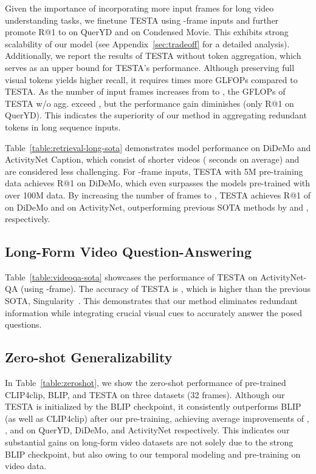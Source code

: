 \documentclass[11pt]{article}
\newcommand{\modelname}{TESTA\xspace}
\begin{document}
Given the importance of incorporating more input frames for long video understanding tasks, we finetune \modelname using -frame inputs and further promote R@1 to  on QuerYD and  on Condensed Movie. This exhibits strong scalability of our model (see Appendix~\ref{sec:tradeoff} for a detailed analysis). 
Additionally, we report the results of \modelname without token aggregation, which serves as an upper bound for \modelname's performance. 
Although preserving full visual tokens yields higher recall, it requires  times more GLFOPs compared to \modelname. 
As the number of input frames increases from  to , the GFLOPs of \modelname w/o agg. exceed , but the performance gain diminishes (only  R@1 on QuerYD). This indicates the superiority of our method in aggregating redundant tokens in long sequence inputs. 



Table~\ref{table:retrieval-long-sota} demonstrates model performance on  DiDeMo and ActivityNet Caption, which consist of shorter videos ( seconds on average) and are considered less challenging.  
For -frame inputs, \modelname with 5M pre-training data achieves  R@1 on DiDeMo, which even surpasses the models pre-trained with over 100M data. 
By increasing the number of frames to , \modelname achieves R@1 of  on DiDeMo and  on ActivityNet, outperforming previous SOTA methods by  and , respectively.~ 


\subsection{Long-Form Video Question-Answering}
Table~\ref{table:videoqa-sota} showcases the performance of \modelname on ActivityNet-QA (using -frame). 
The accuracy of \modelname is , which is  higher than the previous SOTA, Singularity~\citep{Lei2022RevealingSF}. 
This demonstrates that our method eliminates redundant information while integrating crucial visual cues to accurately answer the posed questions. 


\subsection{Zero-shot Generalizability}
In Table~\ref{table:zeroshot}, we show the zero-shot performance of pre-trained CLIP4clip, BLIP, and \modelname on three datasets (32 frames). 
Although our \modelname is initialized by the BLIP checkpoint, it consistently outperforms BLIP (as well as CLIP4clip) after our pre-training, achieving average improvements of , , and  on QuerYD, DiDeMo, and ActivityNet respectively. 
This indicates our substantial gains on long-form video datasets are not solely due to the strong BLIP checkpoint, but also owing to our temporal modeling and pre-training on video data. 
\end{document}
